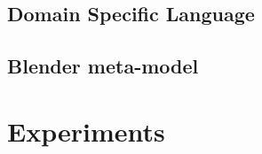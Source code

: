 

\subsection{Domain Specific Language}
\lipsum[1-3]

\subsection{Blender meta-model}
\lipsum[1-3]


\hypertarget{experiments}{%
\section{Experiments}\label{experiments}}

